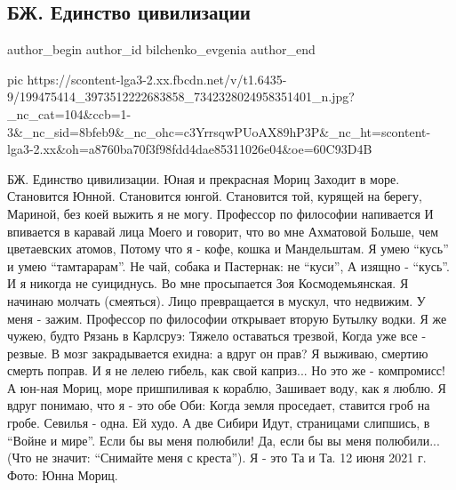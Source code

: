  
 
 
 
 
 
\subsection{БЖ. Единство цивилизации}
\label{sec:12_06_2021.fb.bilchenko_evgenia.7.civilizacia_jedinstvo}
\ifcmt
 author_begin
   author_id bilchenko_evgenia
 author_end
\fi

\ifcmt
  pic https://scontent-lga3-2.xx.fbcdn.net/v/t1.6435-9/199475414_3973512222683858_7342328024958351401_n.jpg?_nc_cat=104&ccb=1-3&_nc_sid=8bfeb9&_nc_ohc=c3YrrsqwPUoAX89hP3P&_nc_ht=scontent-lga3-2.xx&oh=a8760ba70f3f98fdd4dae85311026e04&oe=60C93D4B
\fi

БЖ. Единство цивилизации.
Юная и прекрасная Мориц
Заходит в море.
Становится Юнной.
Становится юнгой.
Становится той, курящей на берегу,
Мариной, без коей выжить я не могу.
Профессор по философии напивается
И впивается в каравай лица
Моего и говорит, что во мне Ахматовой
Больше, чем цветаевских атомов,
Потому что я - кофе, кошка и Мандельштам.
Я умею \enquote{кусь} и умею \enquote{тамтарарам}.
Не чай, собака и Пастернак: не \enquote{куси}, 
А изящно - \enquote{кусь}.
И я никогда не суициднусь.
Во мне просыпается Зоя Космодемьянская.
Я начинаю молчать (смеяться).
Лицо превращается в мускул, что недвижим.
У меня - зажим. 
Профессор по философии открывает вторую
Бутылку водки. Я же чужею, будто Рязань в Карлсруэ:
Тяжело оставаться трезвой,
Когда уже все - резвые.
В мозг закрадывается ехидна: а вдруг он прав?
Я выживаю, смертию смерть поправ.
И я не лелею гибель, как свой каприз...
Но это же - компромисс!
А юн-ная Мориц, море пришпиливая к кораблю,
Зашивает воду, как я люблю.
Я вдруг понимаю, что я - это обе 
Оби:
Когда земля проседает, ставится гроб на гробе.
Севилья - одна. Ей худо. А две Сибири
Идут, страницами слипшись, в \enquote{Войне и мире}.
Если бы вы меня полюбили!
Да, если бы вы меня полюбили...
(Что не значит: \enquote{Снимайте меня с креста}).
Я - это Та и Та. 
12 июня 2021 г.
Фото: Юнна Мориц.
